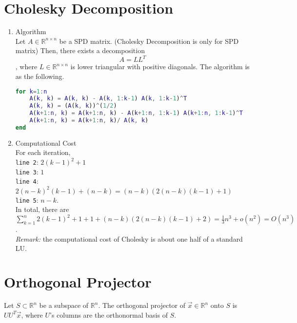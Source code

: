 \documentclass[11pt]{article}
\begin{document}
\section{Cholesky Decomposition}
\begin{enumerate}
\item{Algorithm}\\
Let $A \in \mathbb{R}^{n \times n}$ be a SPD matrix. (Cholesky Decomposition is only for SPD matrix) Then, there exists a decomposition $$A = L L^T$$, where $L \in \mathbb{R}^{n \times n}$ is lower triangular with positive diagonals. The algorithm is as the following.
\begin{lstlisting}[language = matlab]
for k=1:n
	A(k, k) = A(k, k) - A(k, 1:k-1) A(k, 1:k-1)^T
	A(k, k) = (A(k, k))^(1/2)
	A(k+1:n, k) = A(k+1:n, k) - A(k+1:n, 1:k-1) A(k+1:n, 1:k-1)^T
	A(k+1:n, k) = A(k+1:n, k)/ A(k, k)
end
\end{lstlisting}
\item{Computational Cost}\\
For each iteration, \\
\texttt{line 2}: $2(k-1)^2 + 1$\\
\texttt{line 3}: $1$\\
\texttt{line 4}: $2(n-k)^2 (k-1)+ (n-k) = (n-k)(2(n-k)(k-1) +1)$\\
\texttt{line 5}: $n-k$.\\
In total, there are $\sum_{k=1}^{n} 2(k-1)^2 + 1+1+(n-k)(2(n-k)(k-1) +2) = \frac{1}{3}n^3 + o(n^2) = O(n^3)$.\\
\textit{Remark:} the computational cost of Cholesky is about one half of a standard LU.
\end{enumerate}

\newpage
\section{Orthogonal Projector}
Let $S \subset \mathbb{R}^n$ be a subspace of $\mathbb{R}^n$.
The orthogonal projector of $\vec{x} \in \mathbb{R}^n$ onto $S$ is $U U^{T} \vec{x}$, where $U$'s columns are the orthonormal basis of $S$.
\end{document}
